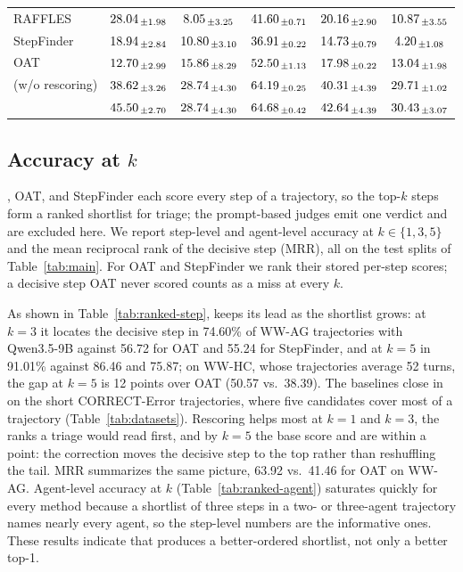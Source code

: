 \begin{table}[h]
\begin{tabular}{l ccccc}
RAFFLES       & $28.04_{\,\pm 1.98}$ & $8.05_{\,\pm 3.25}$  & $41.60_{\,\pm 0.71}$ & $20.16_{\,\pm 2.90}$ & $10.87_{\,\pm 3.55}$ \\
StepFinder    & $18.94_{\,\pm 2.84}$ & $10.80_{\,\pm 3.10}$ & $36.91_{\,\pm 0.22}$ & $14.73_{\,\pm 0.79}$ & $4.20_{\,\pm 1.08}$ \\
OAT           & $12.70_{\,\pm 2.99}$ & $15.86_{\,\pm 8.29}$ & $52.50_{\,\pm 1.13}$ & $17.98_{\,\pm 0.22}$ & $13.04_{\,\pm 1.98}$ \\
\soap{} (w/o rescoring) & $38.62_{\,\pm 3.26}$ & $28.74_{\,\pm 4.30}$ & $64.19_{\,\pm 0.25}$ & $40.31_{\,\pm 4.39}$ & $29.71_{\,\pm 1.02}$ \\
\soap{}       & $45.50_{\,\pm 2.70}$ & $28.74_{\,\pm 4.30}$ & $64.68_{\,\pm 0.42}$ & $42.64_{\,\pm 4.39}$ & $30.43_{\,\pm 3.07}$ \\
\bottomrule
\end{tabular}
\end{table}

\subsection{Accuracy at $k$}
\label{app:ranked}

\soap{}, OAT, and StepFinder each score every step of a trajectory, so the top-$k$
steps form a ranked shortlist for triage; the prompt-based judges emit one verdict
and are excluded here. We report step-level and agent-level accuracy at
$k \in \{1, 3, 5\}$ and the mean reciprocal rank of the decisive step (MRR), all on the
test splits of Table~\ref{tab:main}. For OAT and StepFinder we rank their stored
per-step scores; a decisive step OAT never scored counts as a miss at every $k$.

As shown in Table~\ref{tab:ranked-step}, \soap{} keeps its lead as the shortlist
grows: at $k=3$ it locates the decisive step in 74.60\% of WW-AG trajectories with
Qwen3.5-9B against 56.72 for OAT and 55.24 for StepFinder, and at $k=5$ in 91.01\%
against 86.46 and 75.87; on WW-HC, whose trajectories average 52 turns, the gap at
$k=5$ is 12 points over OAT (50.57 vs.\ 38.39). The baselines close in on the short
CORRECT-Error trajectories, where five candidates cover most of a trajectory
(Table~\ref{tab:datasets}). Rescoring helps most at $k=1$ and $k=3$, the ranks a
triage would read first, and by $k=5$ the base score and \soap{} are within a point:
the correction moves the decisive step to the top rather than reshuffling the tail.
MRR summarizes the same picture, 63.92 vs.\ 41.46 for OAT on WW-AG. Agent-level
accuracy at $k$ (Table~\ref{tab:ranked-agent}) saturates quickly for every method
because a shortlist of three steps in a two- or three-agent trajectory names nearly
every agent, so the step-level numbers are the informative ones. These results
indicate that \soap{} produces a better-ordered shortlist, not only a better top-1.

